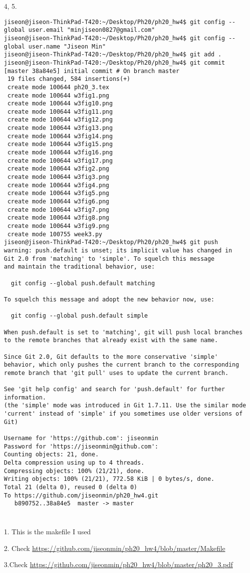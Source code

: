 \documentclass[10pt]{article}
\begin{document}
4, 5.
\begin{lstlisting}
jiseon@jiseon-ThinkPad-T420:~/Desktop/Ph20/ph20_hw4$ git config --global user.email "minjiseon0827@gmail.com"
jiseon@jiseon-ThinkPad-T420:~/Desktop/Ph20/ph20_hw4$ git config --global user.name "Jiseon Min"
jiseon@jiseon-ThinkPad-T420:~/Desktop/Ph20/ph20_hw4$ git add .
jiseon@jiseon-ThinkPad-T420:~/Desktop/Ph20/ph20_hw4$ git commit
[master 38a84e5] initial commit # On branch master
 19 files changed, 584 insertions(+)
 create mode 100644 ph20_3.tex
 create mode 100644 w3fig1.png
 create mode 100644 w3fig10.png
 create mode 100644 w3fig11.png
 create mode 100644 w3fig12.png
 create mode 100644 w3fig13.png
 create mode 100644 w3fig14.png
 create mode 100644 w3fig15.png
 create mode 100644 w3fig16.png
 create mode 100644 w3fig17.png
 create mode 100644 w3fig2.png
 create mode 100644 w3fig3.png
 create mode 100644 w3fig4.png
 create mode 100644 w3fig5.png
 create mode 100644 w3fig6.png
 create mode 100644 w3fig7.png
 create mode 100644 w3fig8.png
 create mode 100644 w3fig9.png
 create mode 100755 week3.py
jiseon@jiseon-ThinkPad-T420:~/Desktop/Ph20/ph20_hw4$ git push
warning: push.default is unset; its implicit value has changed in
Git 2.0 from 'matching' to 'simple'. To squelch this message
and maintain the traditional behavior, use:

  git config --global push.default matching

To squelch this message and adopt the new behavior now, use:

  git config --global push.default simple

When push.default is set to 'matching', git will push local branches
to the remote branches that already exist with the same name.

Since Git 2.0, Git defaults to the more conservative 'simple'
behavior, which only pushes the current branch to the corresponding
remote branch that 'git pull' uses to update the current branch.

See 'git help config' and search for 'push.default' for further information.
(the 'simple' mode was introduced in Git 1.7.11. Use the similar mode
'current' instead of 'simple' if you sometimes use older versions of Git)

Username for 'https://github.com': jiseonmin
Password for 'https://jiseonmin@github.com': 
Counting objects: 21, done.
Delta compression using up to 4 threads.
Compressing objects: 100% (21/21), done.
Writing objects: 100% (21/21), 772.58 KiB | 0 bytes/s, done.
Total 21 (delta 0), reused 0 (delta 0)
To https://github.com/jiseonmin/ph20_hw4.git
   b890752..38a84e5  master -> master
\end{lstlisting}




\section{}
1.
This is the makefile I used



2. Check \url{https://github.com/jiseonmin/ph20_hw4/blob/master/Makefile}

3.Check \url{https://github.com/jiseonmin/ph20_hw4/blob/master/ph20_3.pdf}
\end{document}
